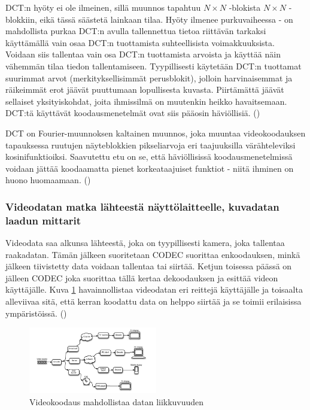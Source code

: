 DCT:n hyöty ei ole ilmeinen, sillä muunnos tapahtuu $N \times N$ -blokista
$N \times N$ -blokkiin, eikä tässä säästetä lainkaan  tilaa. Hyöty ilmenee
purkuvaiheessa - on mahdollista purkaa DCT:n avulla tallennettua tietoa
riittävän tarkaksi käyttämällä vain osaa DCT:n tuottamista suhteellisista
voimakkuuksista. Voidaan siis tallentaa vain osa DCT:n tuottamista arvoista
ja käyttää näin vähemmän tilaa tiedon tallentamiseen. Tyypillisesti käytetään
DCT:n tuottamat suurimmat arvot (merkityksellisimmät perusblokit), jolloin
harvinaisemmat ja räikeimmät erot jäävät puuttumaan lopullisesta kuvasta.
Piirtämättä jäävät sellaiset yksityiskohdat, joita ihmissilmä on muutenkin
heikko havaitsemaan. DCT:tä käyttävät koodausmenetelmät ovat siis pääosin
häviöllisiä. (\cite{h264})

DCT on Fourier-muunnoksen kaltainen muunnos, joka muuntaa videokoodauksen
tapauksessa ruutujen näyteblokkien pikseliarvoja eri taajuuksilla värähteleviksi
kosinifunktioiksi. Saavutettu etu on se, että häviöllisissä koodausmenetelmissä
voidaan jättää koodaamatta pienet korkeataajuiset funktiot - niitä ihminen
on huono huomaamaan. (\cite{h264})

\subsubsection{Videodatan matka lähteestä näyttölaitteelle, kuvadatan laadun mittarit}

Videodata saa alkunsa lähteestä, joka on tyypillisesti kamera, joka tallentaa
raakadatan. Tämän jälkeen suoritetaan CODEC suorittaa enkoodauksen, minkä
jälkeen tiivistetty data voidaan tallentaa tai siirtää. Ketjun toisessa
päässä on jälleen CODEC joka suorittaa tällä kertaa dekoodauksen ja esittää
videon käyttäjälle. Kuva \ref{fig:codec} havainnollistaa videodatan eri reittejä
käyttäjälle ja toisaalta alleviivaa sitä, että kerran koodattu data on helppo
siirtää ja se toimii erilaisissa ympäristöissä. (\cite{h264})

\begin{figure}[ht]
	\centering
	\includegraphics[width=0.5\textwidth]{codec.jpg}
	\caption{Videokoodaus mahdollistaa datan liikkuvuuden}
	\label{fig:codec}
\end{figure}

